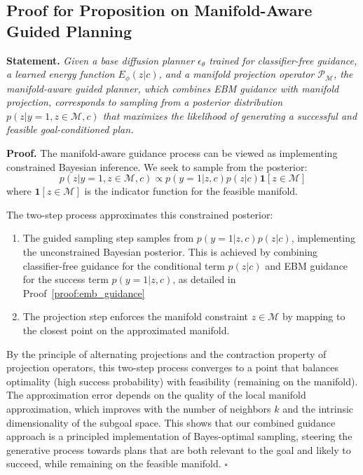 \documentclass{article} %
\begin{document}
\subsection{Proof for Proposition on Manifold-Aware Guided Planning}
\textbf{Statement.} \textit{Given a base diffusion planner $\epsilon_\theta$ trained for classifier-free guidance, a learned energy function $E_\phi(z|c)$, and a manifold projection operator $\mathcal{P}_{\mathcal{M}}$, the manifold-aware guided planner, which combines EBM guidance with manifold projection, corresponds to sampling from a posterior distribution $p(z|y=1, z \in \mathcal{M}, c)$ that maximizes the likelihood of generating a successful and feasible goal-conditioned plan.}

\textbf{Proof.}
The manifold-aware guidance process can be viewed as implementing constrained Bayesian inference. We seek to sample from the posterior:
\[
p(z|y=1, z \in \mathcal{M}, c) \propto p(y=1|z,c) p(z|c) \mathbf{1}[z \in \mathcal{M}]
\]
where $\mathbf{1}[z \in \mathcal{M}]$ is the indicator function for the feasible manifold.

The two-step process approximates this constrained posterior:
\begin{enumerate}
    \item The guided sampling step samples from $p(y=1|z,c) p(z|c)$, implementing the unconstrained Bayesian posterior. This is achieved by combining classifier-free guidance for the conditional term $p(z|c)$ and EBM guidance for the success term $p(y=1|z,c)$, as detailed in Proof~\ref{proof:emb_guidance}
    \item The projection step enforces the manifold constraint $z \in \mathcal{M}$ by mapping to the closest point on the approximated manifold.
\end{enumerate}

By the principle of alternating projections and the contraction property of projection operators, this two-step process converges to a point that balances optimality (high success probability) with feasibility (remaining on the manifold). The approximation error depends on the quality of the local manifold approximation, which improves with the number of neighbors $k$ and the intrinsic dimensionality of the subgoal space. This shows that our combined guidance approach is a principled implementation of Bayes-optimal sampling, steering the generative process towards plans that are both relevant to the goal and likely to succeed, while remaining on the feasible manifold. $\square$
\end{document}
